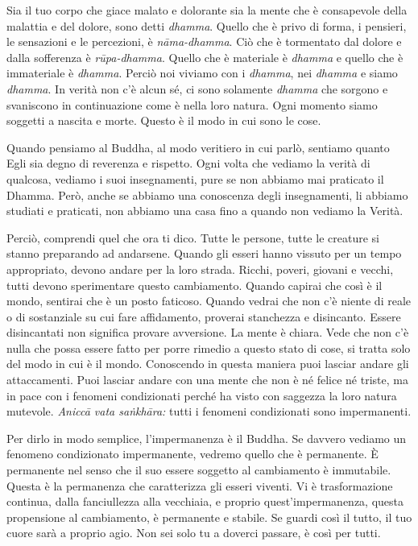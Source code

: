 Sia il tuo corpo che giace malato e dolorante sia la mente che è
consapevole della malattia e del dolore, sono detti \emph{dhamma}.
Quello che è privo di forma, i pensieri, le sensazioni e le percezioni,
è \emph{nāma-dhamma}. Ciò che è tormentato dal dolore e dalla sofferenza
è \emph{rūpa-dhamma}. Quello che è materiale è \emph{dhamma} e quello
che è immateriale è \emph{dhamma}. Perciò noi viviamo con i
\emph{dhamma}, nei \emph{dhamma} e siamo \emph{dhamma}. In verità non
c'è alcun sé, ci sono solamente \emph{dhamma} che sorgono e svaniscono
in continuazione come è nella loro natura. Ogni momento siamo soggetti a
nascita e morte. Questo è il modo in cui sono le cose.

Quando pensiamo al Buddha, al modo veritiero in cui parlò, sentiamo
quanto Egli sia degno di reverenza e rispetto. Ogni volta che vediamo la
verità di qualcosa, vediamo i suoi insegnamenti, pure se non abbiamo mai
praticato il Dhamma. Però, anche se abbiamo una conoscenza degli
insegnamenti, li abbiamo studiati e praticati, non abbiamo una casa fino
a quando non vediamo la Verità.

Perciò, comprendi quel che ora ti dico. Tutte le persone, tutte le
creature si stanno preparando ad andarsene. Quando gli esseri hanno
vissuto per un tempo appropriato, devono andare per la loro strada.
Ricchi, poveri, giovani e vecchi, tutti devono sperimentare questo
cambiamento. Quando capirai che così è il mondo, sentirai che è un posto
faticoso. Quando vedrai che non c'è niente di reale o di sostanziale su
cui fare affidamento, proverai stanchezza e disincanto. Essere
disincantati non significa provare avversione. La mente è chiara. Vede
che non c'è nulla che possa essere fatto per porre rimedio a questo
stato di cose, si tratta solo del modo in cui è il mondo. Conoscendo in
questa maniera puoi lasciar andare gli attaccamenti. Puoi lasciar andare
con una mente che non è né felice né triste, ma in pace con i fenomeni
condizionati perché ha visto con saggezza la loro natura mutevole.
\emph{Aniccā vata saṅkhāra:} tutti i fenomeni condizionati sono
impermanenti.

Per dirlo in modo semplice, l'impermanenza è il Buddha. Se davvero
vediamo un fenomeno condizionato impermanente, vedremo quello che è
permanente. È permanente nel senso che il suo essere soggetto al
cambiamento è immutabile. Questa è la permanenza che caratterizza gli
esseri viventi. Vi è trasformazione continua, dalla fanciullezza alla
vecchiaia, e proprio quest'impermanenza, questa propensione al
cambiamento, è permanente e stabile. Se guardi così il tutto, il tuo
cuore sarà a proprio agio. Non sei solo tu a doverci passare, è così per
tutti.

